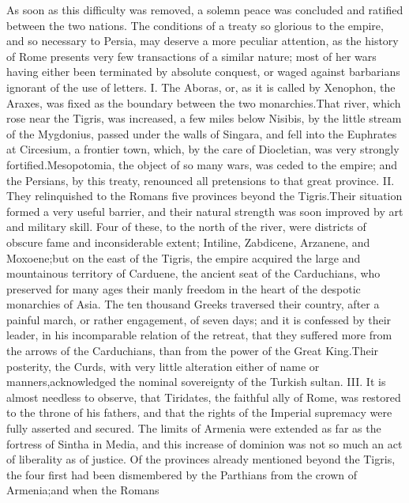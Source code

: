 As soon as this difficulty was removed, a solemn peace was
concluded and ratified between the two nations. The conditions of
a treaty so glorious to the empire, and so necessary to Persia,
may deserve a more peculiar attention, as the history of Rome
presents very few transactions of a similar nature; most of her
wars having either been terminated by absolute conquest, or waged
against barbarians ignorant of the use of letters. I. The Aboras,
or, as it is called by Xenophon, the Araxes, was fixed as the
boundary between the two monarchies.\footnotemark[77] That river, which rose
near the Tigris, was increased, a few miles below Nisibis, by the
little stream of the Mygdonius, passed under the walls of
Singara, and fell into the Euphrates at Circesium, a frontier
town, which, by the care of Diocletian, was very strongly
fortified.\footnotemark[78] Mesopotomia, the object of so many wars, was ceded
to the empire; and the Persians, by this treaty, renounced all
pretensions to that great province. II. They relinquished to the
Romans five provinces beyond the Tigris.\footnotemark[79] Their situation
formed a very useful barrier, and their natural strength was soon
improved by art and military skill. Four of these, to the north
of the river, were districts of obscure fame and inconsiderable
extent; Intiline, Zabdicene, Arzanene, and Moxoene;\footnotemark[791] but on
the east of the Tigris, the empire acquired the large and
mountainous territory of Carduene, the ancient seat of the
Carduchians, who preserved for many ages their manly freedom in
the heart of the despotic monarchies of Asia. The ten thousand
Greeks traversed their country, after a painful march, or rather
engagement, of seven days; and it is confessed by their leader,
in his incomparable relation of the retreat, that they suffered
more from the arrows of the Carduchians, than from the power of
the Great King.\footnotemark[80] Their posterity, the Curds, with very little
alteration either of name or manners,\footnotemark[801] acknowledged the
nominal sovereignty of the Turkish sultan. III. It is almost
needless to observe, that Tiridates, the faithful ally of Rome,
was restored to the throne of his fathers, and that the rights of
the Imperial supremacy were fully asserted and secured. The
limits of Armenia were extended as far as the fortress of Sintha
in Media, and this increase of dominion was not so much an act of
liberality as of justice. Of the provinces already mentioned
beyond the Tigris, the four first had been dismembered by the
Parthians from the crown of Armenia;\footnotemark[81] and when the Romans
